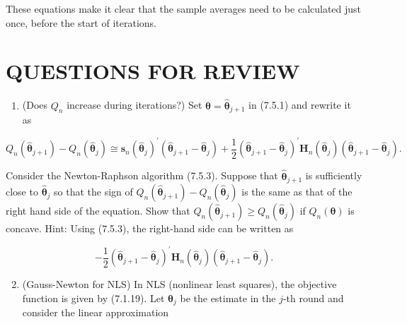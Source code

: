 \documentclass[10pt]{article}
\begin{document}
These equations make it clear that the sample averages need to be calculated just once, before the start of iterations.

\section*{QUESTIONS FOR REVIEW}
\begin{enumerate}
  \item (Does $Q_{n}$ increase during iterations?) Set $\boldsymbol{\theta}=\hat{\boldsymbol{\theta}}_{j+1}$ in (7.5.1) and rewrite it as
\end{enumerate}

$$
Q_{n}\left(\hat{\boldsymbol{\theta}}_{j+1}\right)-Q_{n}\left(\hat{\boldsymbol{\theta}}_{j}\right) \cong \mathbf{s}_{n}\left(\hat{\boldsymbol{\theta}}_{j}\right)^{\prime}\left(\hat{\boldsymbol{\theta}}_{j+1}-\hat{\boldsymbol{\theta}}_{j}\right)+\frac{1}{2}\left(\hat{\boldsymbol{\theta}}_{j+1}-\hat{\boldsymbol{\theta}}_{j}\right)^{\prime} \mathbf{H}_{n}\left(\hat{\boldsymbol{\theta}}_{j}\right)\left(\hat{\boldsymbol{\theta}}_{j+1}-\hat{\boldsymbol{\theta}}_{j}\right) .
$$

Consider the Newton-Raphson algorithm (7.5.3). Suppose that $\hat{\boldsymbol{\theta}}_{j+1}$ is sufficiently close to $\hat{\boldsymbol{\theta}}_{j}$ so that the sign of $Q_{n}\left(\hat{\boldsymbol{\theta}}_{j+1}\right)-Q_{n}\left(\hat{\boldsymbol{\theta}}_{j}\right)$ is the same as that of the right hand side of the equation. Show that $Q_{n}\left(\hat{\boldsymbol{\theta}}_{j+1}\right) \geq Q_{n}\left(\hat{\boldsymbol{\theta}}_{j}\right)$ if $Q_{n}(\boldsymbol{\theta})$ is concave. Hint: Using (7.5.3), the right-hand side can be written as

$$
-\frac{1}{2}\left(\hat{\boldsymbol{\theta}}_{j+1}-\hat{\boldsymbol{\theta}}_{j}\right)^{\prime} \mathbf{H}_{n}\left(\hat{\boldsymbol{\theta}}_{j}\right)\left(\hat{\boldsymbol{\theta}}_{j+1}-\hat{\boldsymbol{\theta}}_{j}\right) .
$$

\begin{enumerate}
  \setcounter{enumi}{1}
  \item (Gauss-Newton for NLS) In NLS (nonlinear least squares), the objective function is given by (7.1.19). Let $\hat{\boldsymbol{\theta}}_{j}$ be the estimate in the $j$-th round and consider the linear approximation
\end{enumerate}
\end{document}
